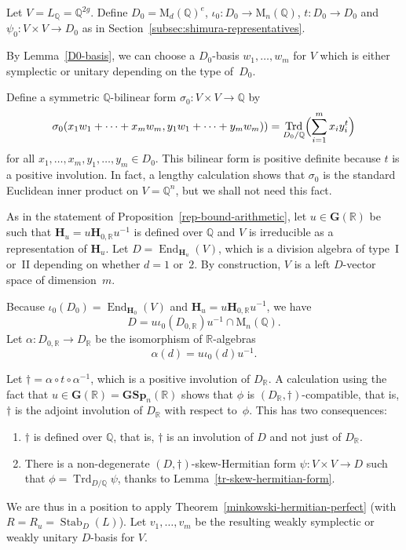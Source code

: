 \documentclass[11pt]{article}
\numberwithin{equation}{section}
\newcommand{\bQ}{\mathbb{Q}}
\newcommand{\bR}{\mathbb{R}}
\newcommand{\gG}{\mathbf{G}}
\newcommand{\gGSp}{\mathbf{GSp}}
\newcommand{\gH}{\mathbf{H}}
\newcommand{\rM}{\mathrm{M}}
\DeclareMathOperator{\End}{End}
\DeclareMathOperator{\Stab}{Stab}
\DeclareMathOperator{\Trd}{Trd}
\begin{document}
Let $V = L_\bQ = \bQ^{2g}$.
Define $D_0 = \rM_d(\bQ)^e$, $\iota_0 \colon D_0 \to \rM_n(\bQ)$, $t \colon D_0 \to D_0$ and $\psi_0 \colon V \times V \to D_0$ as in Section~\ref{subsec:shimura-representatives}.

By Lemma~\ref{D0-basis}, we can choose a $D_0$-basis $w_1, \dotsc, w_m$ for $V$ which is either symplectic or unitary depending on the type of~$D_0$.

Define a symmetric $\bQ$-bilinear form $\sigma_0 \colon V \times V \to \bQ$ by
\[
\sigma_0(x_1w_1 + \dotsb + x_mw_m, y_1w_1 + \dotsb + y_mw_m)) = \Trd_{D_0/\bQ} \Bigl(\sum_{i=1}^m x_i y_i^t\Bigr)
\]
for all $x_1, \dotsc, x_m, y_1, \dotsc, y_m \in D_0$.
This bilinear form is positive definite because $t$ is a positive involution.
In fact, a lengthy calculation shows that $\sigma_0$ is the standard Euclidean inner product on $V = \bQ^n$, but we shall not need this fact.

As in the statement of Proposition~\ref{rep-bound-arithmetic}, let $u \in \gG(\bR)$ be such that $\gH_u = u\gH_{0,\bR}u^{-1}$ is defined over $\bQ$ and $V$ is irreducible as a representation of $\gH_u$.
Let $D = \End_{\gH_u}(V)$, which is a division algebra of type~I or~II depending on whether $d=1$ or~$2$.
By construction, $V$ is a left $D$-vector space of dimension~$m$.

Because $\iota_0(D_0) = \End_{\gH_0}(V)$ and $\gH_u = u\gH_{0,\bR}u^{-1}$, we have
\[
D = u\iota_0(D_{0,\bR})u^{-1} \cap \rM_n(\bQ).
\]
Let $\alpha \colon D_{0,\bR} \to D_\bR$ be the isomorphism of $\bR$-algebras
\[
\alpha(d) = u \iota_0(d) u^{-1}.
\]

Let $\dag = \alpha \circ t \circ \alpha^{-1}$, which is a positive involution of $D_\bR$.
A calculation using the fact that $u \in \gG(\bR) = \gGSp_n(\bR)$ shows that $\phi$ is $(D_\bR,\dag)$-compatible, that is, $\dag$ is the adjoint involution of $D_\bR$ with respect to~$\phi$.
This has two consequences:
\begin{enumerate}
\item $\dag$ is defined over $\bQ$, that is, $\dag$ is an involution of $D$ and not just of $D_\bR$.
\item There is a non-degenerate $(D,\dag)$-skew-Hermitian form $\psi \colon V \times V \to D$ such that $\phi = \Trd_{D/\bQ} \psi$, thanks to Lemma~\ref{tr-skew-hermitian-form}.
\end{enumerate}

We are thus in a position to apply Theorem~\ref{minkowski-hermitian-perfect} (with $R=R_u=\Stab_D(L)$).
Let $v_1, \dotsc, v_m$ be the resulting weakly symplectic or weakly unitary $D$-basis for $V$.
\end{document}

